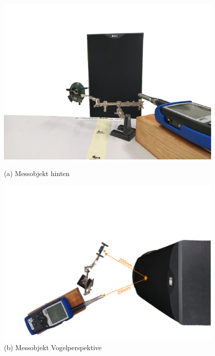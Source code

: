 \documentclass[12pt]{article}
\begin{document}
		\begin{figure}[H] 
			\centering 
			\begin{minipage}
				{0.45\textwidth} 		\includegraphics[width=\linewidth]{Beide_Hinten-removebg} \caption*{(a) Messobjekt hinten} 
			\end{minipage} 
			\hfill 
			\begin{minipage}
				{0.45\textwidth} \includegraphics[width=\linewidth]{Beide_Top-removebg} \caption*{(b) Messobjekt Vogelperspektive} 
			\end{minipage} 
			\vfill
			\begin{minipage}

\end{minipage}
\end{figure}
\end{document}
